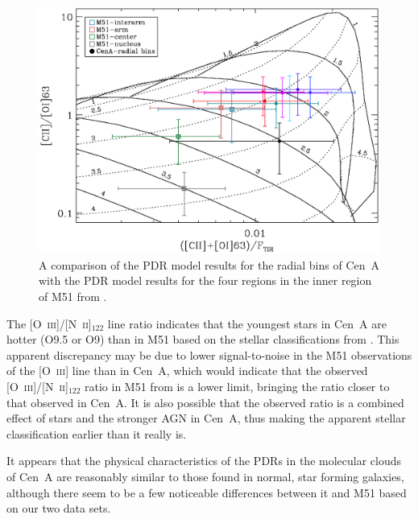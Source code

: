 \documentclass[preprint2]{aastex}
\begin{document}
\begin{figure}
\includegraphics[width=\columnwidth]{CenA_CIIOI63_vs_CIIOI63onFtir_corrected_plot_radial_bins_wM51overlay_v2}
\caption{A comparison of the PDR model results for the radial bins of Cen~A with the PDR model results for the four regions in the inner region of M51 from \citet{parkin_2013}.}
\label{fig:pdr_comparison}
\end{figure}

The [O~\textsc{iii}]/[N~\textsc{ii}]$_{122}$ line ratio indicates that the youngest stars in Cen~A are hotter (O9.5 or O9) than in M51 \citep[B0; ][]{parkin_2013} based on the stellar classifications from \citet{1996ApJ...460..914V}.  This apparent discrepancy may be due to lower signal-to-noise in the M51 observations of the [O~\textsc{iii}] line than in Cen~A, which would indicate that the observed [O~\textsc{iii}]/[N~\textsc{ii}]$_122$ ratio in M51 from \citet{parkin_2013} is a lower limit, bringing the ratio closer to that observed in Cen~A.  It is also possible that the observed ratio is a combined effect of stars and the stronger AGN in Cen~A, thus making the apparent stellar classification earlier than it really is.

It appears that the physical characteristics of the PDRs in the molecular clouds of Cen~A are reasonably similar to those found in normal, star forming galaxies, although there seem to be a few noticeable differences between it and M51 based on our two data sets.

\end{document}
